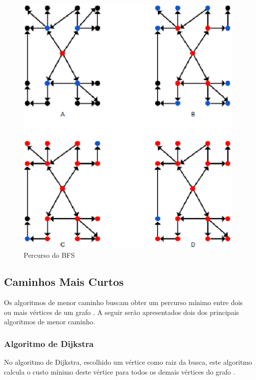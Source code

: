\begin{figure}[!h]
	\centering
	\includegraphics[scale=0.55]{figuras/capitulo2/bfs.eps}
	\caption{Percurso do BFS}
	\label{bfs}
\end{figure}

\subsection{Caminhos Mais Curtos}

Os algoritmos de menor caminho buscam obter um percurso mínimo entre dois ou mais vértices de um grafo \cite{Cormen:2001}. A seguir serão apresentados dois dos principais algoritmos de menor caminho.

\subsubsection{Algoritmo de Dijkstra}

No algoritmo de Dijkstra, escolhido um vértice como raiz da busca, este algoritmo calcula o custo mínimo deste vértice para todos os demais vértices do grafo \cite{Cormen:2001}.

